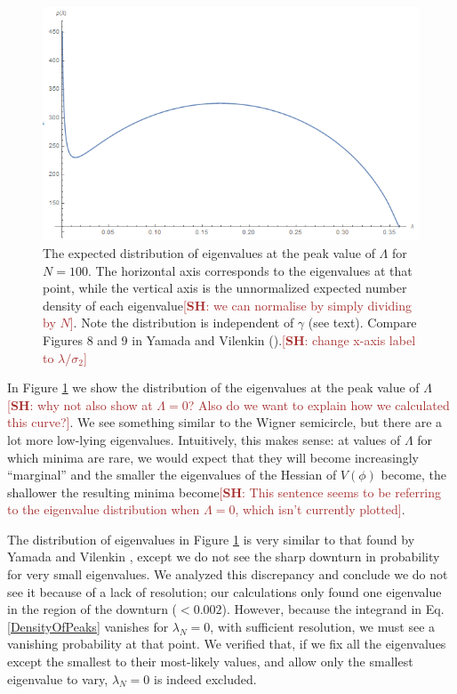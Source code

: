 \documentclass[12pt]{article}
\newcommand{\SH}[1]{\textcolor{brown}{[{\bf SH}: #1]}}
\begin{document}

\begin{figure} 
  \centering
  \includegraphics[width=.9\linewidth]{eigendist.png}
  \caption{The expected distribution of eigenvalues at the peak value of $\Lambda$ for $N=100$. The horizontal axis corresponds to the eigenvalues at that point, while the vertical axis is the unnormalized expected number density of each eigenvalue\SH{we can normalise by simply dividing by $N$}. Note the distribution is independent of $\gamma$ (see text). Compare Figures 8 and 9 in Yamada and Vilenkin (\cite{Yamada2018}).\SH{change x-axis label to $\lambda/\sigma_2$}}
  \label{eigendist}
\end{figure}

In Figure \ref{eigendist} we show the distribution of the eigenvalues at the peak value of $\Lambda$\SH{why not also show at $\Lambda=0$? Also do we want to explain how we calculated this curve?}. We see something similar to the Wigner semicircle, but there are a lot more low-lying eigenvalues. Intuitively, this makes sense: at values of $\Lambda$ for which minima are rare, we would expect that they will become increasingly ``marginal'' and the smaller the eigenvalues of the Hessian of $V(\phi)$ become, the shallower the resulting minima become\SH{This sentence seems to be referring to the eigenvalue distribution when $\Lambda=0$, which isn't currently plotted}. 

The distribution of eigenvalues in Figure \ref{eigendist} is very similar to that found by Yamada and Vilenkin \cite{Yamada2018}, except we do not see the sharp downturn in probability for very small eigenvalues. We analyzed this discrepancy and conclude we do not see it because of a lack of resolution; our calculations only found one eigenvalue in the region of the downturn ($< 0.002$). However, because the integrand in Eq. \ref{DensityOfPeaks} vanishes for $\lambda_N=0$, with sufficient resolution, we must see a vanishing probability at that point. We verified that, if we fix all the eigenvalues except the smallest to their most-likely values, and allow only the smallest eigenvalue to vary, $\lambda_N=0$ is indeed excluded.
\end{document}
